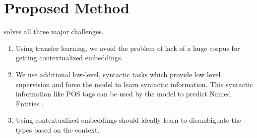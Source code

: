 \section{Proposed Method}
\label{sec:proposed_method}
\method{} solves all three major challenges.
\begin{enumerate}
	\item Using transfer learning, we avoid the problem of lack of a huge corpus for getting contextualized embeddings.
	\item We use additional low-level, syntactic tasks which provide low level supervision and force the model to learn syntactic information. This syntactic information like POS tags can be used by the model to predict Named Entities \cite{autoner} .
	\item Using contextualized embeddings should ideally learn to disambiguate the types based on the context.
\end{enumerate}
